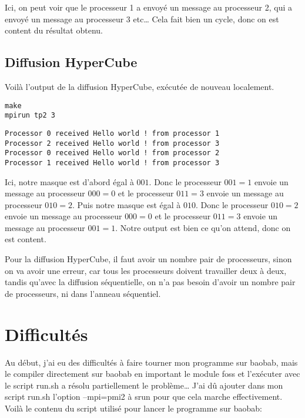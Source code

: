 \documentclass[11pt]{article}
\begin{document}
Ici, on peut voir que le processeur 1 a envoyé un message au processeur 2, qui a envoyé un message au processeur 3 etc\ldots{} Cela fait bien un cycle, donc on est content du résultat obtenu.

\subsection{Diffusion HyperCube}
\label{sec:orga77e252}

Voilà l'output de la diffusion HyperCube, exécutée de nouveau localement.
\begin{verbatim}
make
mpirun tp2 3
\end{verbatim}

\begin{verbatim}
Processor 0 received Hello world ! from processor 1
Processor 2 received Hello world ! from processor 3
Processor 0 received Hello world ! from processor 2
Processor 1 received Hello world ! from processor 3
\end{verbatim}



Ici, notre masque est d'abord égal à \(001\). Donc le processeur \(001 = 1\) envoie un message au processeur \(000 = 0\) et le processeur \(011 = 3\) envoie un message au processeur \(010 = 2\).
Puis notre masque est égal à \(010\). Donc le processeur \(010 = 2\) envoie un message au processeur \(000 = 0\) et le processeur \(011 = 3\) envoie un message au processeur \(001 = 1\).
Notre output est bien ce qu'on attend, donc on est content.

Pour la diffusion HyperCube, il faut avoir un nombre pair de processeurs, sinon on va avoir une erreur, car tous les processeurs doivent travailler deux à deux, tandis qu'avec la diffusion séquentielle, on n'a pas besoin d'avoir un nombre pair de processeurs, ni dans l'anneau séquentiel.

\section{Difficultés}
\label{sec:org003053c}

Au début, j'ai eu des difficultés à faire tourner mon programme sur baobab, mais le compiler directement sur baobab en important le module foss et l'exécuter avec le script run.sh a résolu partiellement le problème\ldots{}
J'ai dû ajouter dans mon script run.sh l'option --mpi=pmi2 à srun pour que cela marche effectivement. Voilà le contenu du script utilisé pour lancer le programme sur baobab:
\end{document}
